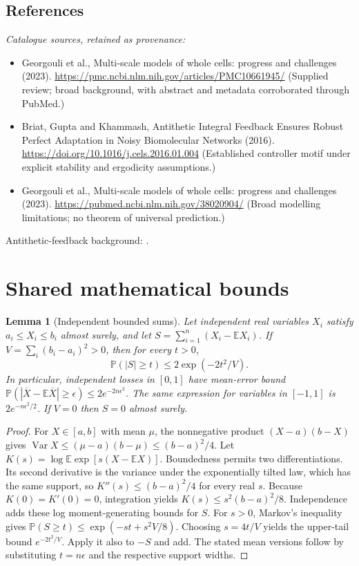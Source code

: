 \documentclass[11pt]{article}
\newcommand{\E}{\mathbb E}
\newcommand{\Prob}{\mathbb P}
\DeclareMathOperator{\Var}{Var}
\providecommand{\E}{\mathbb E}
\providecommand{\Prob}{\mathbb P}
\providecommand{\Var}{\operatorname{Var}}
\newtheorem{sharedlemma}{Lemma}[section]
\begin{document}
\subsection{References}
\noindent\emph{Catalogue sources, retained as provenance:}
\begin{itemize}
\item Georgouli et al., Multi-scale models of whole cells: progress and challenges (2023). \url{https://pmc.ncbi.nlm.nih.gov/articles/PMC10661945/} (Supplied review; broad background, with abstract and metadata corroborated through PubMed.)
\item Briat, Gupta and Khammash, Antithetic Integral Feedback Ensures Robust Perfect Adaptation in Noisy Biomolecular Networks (2016). \url{https://doi.org/10.1016/j.cels.2016.01.004} (Established controller motif under explicit stability and ergodicity assumptions.)
\item Georgouli et al., Multi-scale models of whole cells: progress and challenges (2023). \url{https://pubmed.ncbi.nlm.nih.gov/38020904/} (Broad modelling limitations; no theorem of universal prediction.)
\end{itemize}
\noindent Antithetic-feedback background: \cite{briat}.
\clearpage


\appendix
\section{Shared mathematical bounds}\label{app:bounds}
\begin{sharedlemma}[Independent bounded sums]\label{lem:bounded}
Let independent real variables $X_i$ satisfy $a_i\leq X_i\leq b_i$ almost surely,
and let $S=\sum_{i=1}^n(X_i-\E X_i)$. If
$V=\sum_i(b_i-a_i)^2>0$, then for every $t>0$,
\[
 \Prob(|S|\geq t)\leq 2\exp(-2t^2/V).
\]
In particular, independent losses in $[0,1]$ have mean-error bound
$\Prob(|\overline X-\E\overline X|\geq\epsilon)
\leq2e^{-2n\epsilon^2}$. The same expression for variables in $[-1,1]$
is $2e^{-n\epsilon^2/2}$. If $V=0$ then $S=0$ almost surely.
\end{sharedlemma}
\begin{proof}
For $X\in[a,b]$ with mean $\mu$, the nonnegative product
$(X-a)(b-X)$ gives
$\Var X\leq(\mu-a)(b-\mu)\leq(b-a)^2/4$.
Let $K(s)=\log\E\exp[s(X-\E X)]$.
Boundedness permits two differentiations. Its second derivative is the variance
under the exponentially tilted law, which has the same support, so
$K''(s)\leq(b-a)^2/4$ for every real $s$.
Because $K(0)=K'(0)=0$, integration yields
$K(s)\leq s^2(b-a)^2/8$.
Independence adds these log moment-generating bounds for $S$.
For $s>0$, Markov's inequality gives
$\Prob(S\geq t)\leq\exp(-st+s^2V/8)$.
Choosing $s=4t/V$ yields the upper-tail bound $e^{-2t^2/V}$.
Apply it also to $-S$ and add. The stated mean versions follow by substituting
$t=n\epsilon$ and the respective support widths.
\end{proof}
\end{document}
